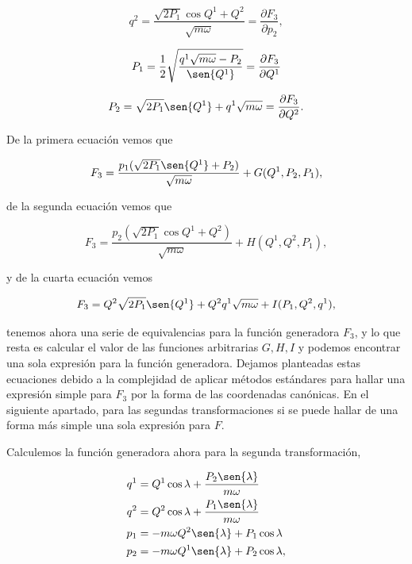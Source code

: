 \documentclass[a4paper,10pt]{article}
\numberwithin{equation}{section}
\begin{document}
\begin{equation}
 q^2 = \frac{\sqrt{2P_1}\cos{Q^1}+Q^2}{\sqrt{m\omega}}  = 
 \frac{\partial F_3}{\partial p_2},
\end{equation}

\begin{equation}
 P_1 = \frac{1}{2}\sqrt{\frac{q^1\sqrt{m\omega}-P_2}{\sen{Q^1}}} = 
 \frac{\partial F_3}{\partial Q^1}
\end{equation}

\begin{equation}
 P_2 = \sqrt{2P_1}\sen{Q^1} + q^1\sqrt{m\omega} = 
 \frac{\partial F_3}{\partial Q^2}.
\end{equation}

De la primera ecuación vemos que 

\begin{equation}
 F_3 = \frac{p_1(\sqrt{2P_1}\sen{Q^1}+P_2)}{\sqrt{m\omega}} + G(Q^1,P_2,P_1),
\end{equation}

de la segunda ecuación vemos que 

\begin{equation}
 F_3 = \frac{p_2(\sqrt{2P_1}\cos{Q^1}+Q^2)}{\sqrt{m\omega}} + H(Q^1,Q^2,P_1),
\end{equation}

y de la cuarta ecuación vemos 

\begin{equation}
 F_3 =  Q^2\sqrt{2P_1}\sen{Q^1} + Q^2q^1\sqrt{m\omega} + I(P_1,Q^2,q^1),
\end{equation}

tenemos ahora una serie de equivalencias para la función generadora $F_3$, y lo que 
resta es calcular el valor de las funciones arbitrarias $G,H,I$ y podemos encontrar 
una sola expresión para la función generadora. Dejamos planteadas estas ecuaciones 
debido a la complejidad de aplicar métodos estándares para hallar una expresión 
simple para $F_3$ por la forma de las coordenadas canónicas. En el siguiente apartado, 
para las segundas transformaciones si se puede hallar de una forma más simple una 
sola expresión para $F$.


\vspace{.3cm}

Calculemos la función generadora ahora para la segunda transformación, 

\begin{align*}
 q^1 &= Q^1\cos{\lambda} + \frac{P_2\sen{\lambda}}{m\omega} \\
 q^2 &= Q^2\cos{\lambda} + \frac{P_1\sen{\lambda}}{m\omega}\\
 p_1 &= - m\omega Q^2\sen{\lambda} + P_1 \cos{\lambda}\\
 p_2 &= - m\omega Q^1\sen{\lambda} + P_2 \cos{\lambda},
\end{align*}
\end{document}
